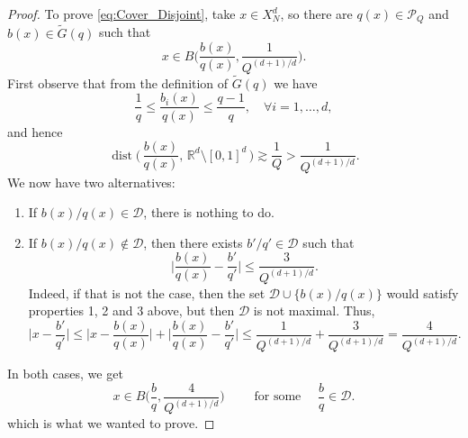 \documentclass[10pt,a4paper]{amsart}
\begin{document}
\begin{proof}
To prove \eqref{eq:Cover_Disjoint}, take $x \in X_N^d$,
so there are $q(x) \in \mathcal P_Q$ and $b(x) \in \widetilde{G}(q)$ such that 
\[x \in B\Big( \frac{b(x)}{q(x)}, \frac{1}{Q^{(d+1)/d}} \Big).\] 
First observe that from the definition of $\widetilde{G}(q)$ we have 
\begin{equation}
    \frac{1}{q} \leq \frac{b_i(x)}{q(x)} \leq \frac{q-1}{q}, \quad \forall i = 1, \ldots, d, 
\end{equation}
and hence 
\[
\operatorname{dist} \Big(\,  \frac{b(x)}{q(x)}, \,  \mathbb R^d \setminus [0,1]^d \, \Big) 
\gtrsim \frac{1}{Q} > \frac{1}{Q^{(d+1)/d}}.
\]
We now have two alternatives: 
\begin{enumerate}
    \item If $b(x)/q(x) \in \mathcal D$, there is nothing to do. 

    \item If $b(x)/q(x) \not\in \mathcal D$, then there exists $b'/q' \in \mathcal D$ such that 
    \begin{equation}
        \Big| \frac{b(x)}{q(x)} - \frac{b'}{q'} \Big| \leq \frac{3}{Q^{(d+1)/d}}.
    \end{equation}
    Indeed, if that is not the case, then the set $\mathcal D \cup \{ b(x)/q(x)\}$ would satisfy properties 1, 2 and 3 above, but then $\mathcal D$ is not maximal.  Thus, 
    \begin{equation}
        \Big| x - \frac{b'}{q'} \Big| 
        \leq \Big| x - \frac{b(x)}{q(x)} \Big| + \Big| \frac{b(x)}{q(x)} - \frac{b'}{q'} \Big|
        \leq \frac{1}{Q^{(d+1)/d}} + \frac{3}{Q^{(d+1)/d}}
        = \frac{4}{Q^{(d+1)/d}}.
    \end{equation}
\end{enumerate}
In both cases, we get 
\[x \in B\Big( \frac{b}{q}, \frac{4}{Q^{(d+1)/d}} \Big)
\qquad \text{ for some } \quad \frac{b}{q} \in \mathcal D. 
\] 
which is what we wanted to prove.
\end{proof}
\end{document}
